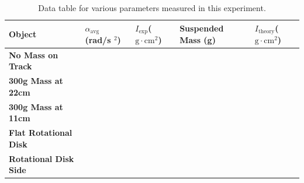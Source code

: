 \begin{center}
\begin{table}
\begin{tabular}{| C{4.5cm} | C{2.6cm} | C{2.6cm} | C{2.6cm} | C{2.6cm} |}
\hline
Object & $\alpha _\text{avg}$ (rad/s $^{2}$) & $I_\text{exp}$($\text{g} \cdot \text{cm} ^{2}$) & Suspended Mass (g) & $I_\text{theory}$($\text{g} \cdot \text{cm}^2$)\\ \hline
 \textbf{No Mass on Track}& && &\\ \hline
 \textbf{300g Mass at 22cm}& & &&\\ \hline
 \textbf{300g Mass at 11cm}& && &\\ \hline
 \textbf{Flat Rotational Disk}& & &&\\ \hline
 \textbf{Rotational Disk Side} & & &&\\ \hline
\end{tabular}
\captionsetup{justification=centering}
\caption{Data table for various parameters measured in this experiment.}
\label{sectab}
\end{table}
\end{center}
